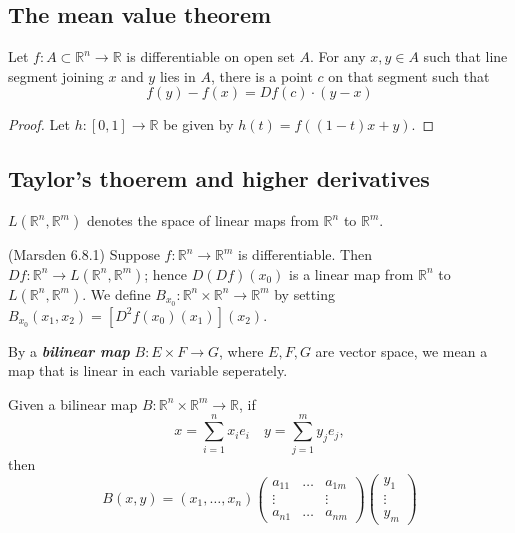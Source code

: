 \subsection{The mean value theorem}

\begin{mytheorem}
Let $f:A\subset \mathbb{R}^n\to \mathbb{R}$ is differentiable on open set $A$.
For any $x,y\in A$ such that line segment joining $x$ and $y$ lies in $A$, there is a point $c$ on that segment such that
$$ f(y)-f(x)=Df(c)\cdot (y-x)$$
\end{mytheorem}
\begin{proof}
Let $h:[0,1]\to \mathbb{R}$ be given by $h(t)=f((1-t)x+y)$.
\end{proof}

\subsection{Taylor's thoerem and higher derivatives}
\begin{notebox}
$L(\mathbb{R}^n,\mathbb{R}^m)$ denotes the space of linear maps from $\mathbb{R}^n$ to $\mathbb{R}^m$.
\end{notebox}
\begin{mydefinition}
(Marsden 6.8.1) Suppose $f:\mathbb{R}^n\to \mathbb{R}^m$ is differentiable. Then $Df:\mathbb{R}^n\to L(\mathbb{R}^n,\mathbb{R}^m)$; hence $D(Df)(x_0)$ is a linear map from $\mathbb{R}^n$ to $L(\mathbb{R}^n,\mathbb{R}^m)$. We define $B_{x_0}:\mathbb{R}^n\times \mathbb{R}^n\to \mathbb{R}^m$ by setting $B_{x_0}(x_1,x_2)=[D^2f(x_0)(x_1)](x_2)$. 
\end{mydefinition}

\begin{notebox}
By a \textbf{\emph{bilinear map}} $B:E\times F\to G$, where $E,F,G$ are vector space, we mean a map that is linear in each variable seperately.
\end{notebox}

Given a bilinear map $B:\mathbb{R}^n\times \mathbb{R}^m\to \mathbb{R}$, if
$$ x=\sum_{i=1}^nx_ie_i\quad y=\sum_{j=1}^my_je_j,$$
then
\begingroup
\everymath{\displaystyle}
$$B(x,y)=(x_1,\dots,x_n)
\begin{pmatrix}
a_{11} & \dots & a_{1m}\\
\vdots & & \vdots\\
a_{n1} & \dots & a_{nm}
\end{pmatrix}
\begin{pmatrix}
y_1\\
\vdots\\
y_m
\end{pmatrix}$$
\endgroup

